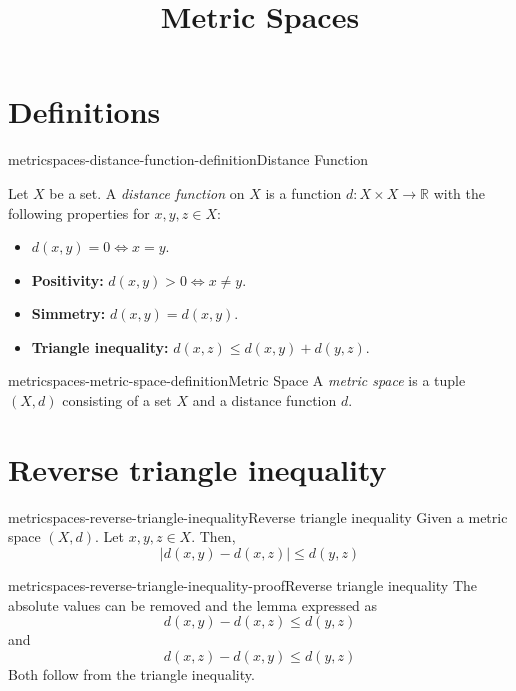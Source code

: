\documentclass[preview]{standalone}
\begin{document}
\title{Metric Spaces}
\genpage

\section{Definitions}

\begin{snippetdefinition}{metricspaces-distance-function-definition}{Distance Function}{
    Let \(X\) be a set.
    A \textit{distance function} on \(X\) is
    a function \(d: X \times X \to \mathbb{R}\)
    with the following properties for \(x,y,z \in X\):
    \begin{itemize}
        \item \(d(x,y) = 0 \iff x = y\).
        \item \textbf{Positivity:} \(d(x,y) > 0 \iff x \neq y\).
        \item \textbf{Simmetry:} \(d(x,y) = d(x,y)\).
        \item \textbf{Triangle inequality:} \(d(x,z) \leq d(x,y) + d(y,z)\).
    \end{itemize}
}
\end{snippetdefinition}

\begin{snippetdefinition}{metricspaces-metric-space-definition}{Metric Space}{
    A \textit{metric space} is a tuple \((X, d)\)
    consisting of a set \(X\) and a distance function \(d\). %
}
\end{snippetdefinition}

\section{Reverse triangle inequality}

\begin{snippetlemma}{metricspaces-reverse-triangle-inequality}{Reverse triangle inequality}{
    Given a metric space \((X,d)\). Let \(x,y,z \in X\).
    Then, \[|d(x,y) - d(x,z)| \leq d(y,z)\]
}
\end{snippetlemma}

\begin{snippetproof}{metricspaces-reverse-triangle-inequality-proof}{Reverse triangle inequality}{
    The absolute values can be removed and the lemma expressed as
    \[
        d(x,y) - d(x,z) \leq d(y,z)
    \]
    and
    \[
        d(x,z) - d(x,y) \leq d(y,z)
    \]
    Both follow from the triangle inequality.
}
\end{snippetproof}
\end{document}
